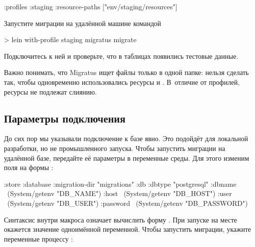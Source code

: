 \begin{english}
  \begin{clojure}
{:profiles
 {:staging
  {:resource-paths
    ["env/staging/resources"]}}}
  \end{clojure}
\end{english}

Запустите миграции на удалённой машине командой

\begin{english}
  \begin{bash}
> lein with-profile staging migratus migrate
  \end{bash}
\end{english}

Подключитесь к ней и проверьте, что в таблицах появились тестовые данные.

Важно понимать, что Migratus ищет файлы только в одной папке: нельзя сделать так, чтобы одновременно использовались ресурсы  и . В~отличие от профилей, ресурсы не подлежат слиянию.

\subsection{Параметры подключения}


До сих пор мы указывали подключение к базе явно. Это подойдёт для локальной разработки, но не промышленного запуска. Чтобы запустить миграции на удалённой базе, передайте её параметры в переменные среды. Для этого изменим поля  на формы :

\begin{english}
  \begin{clojure/lines}
{:store :database
 :migration-dir "migrations"
 :db {:dbtype "postgresql"
      :dbname ~(System/getenv "DB_NAME")
      :host ~(System/getenv "DB_HOST")
      :user ~(System/getenv "DB_USER")
      :password ~(System/getenv "DB_PASSWORD")}}
  \end{clojure/lines}
\end{english}

Синтаксис  внутри макроса  означает вычислить форму . При запуске  на месте  окажется значение одноимённой переменной. Чтобы запустить миграции, укажите переменные процессу :

